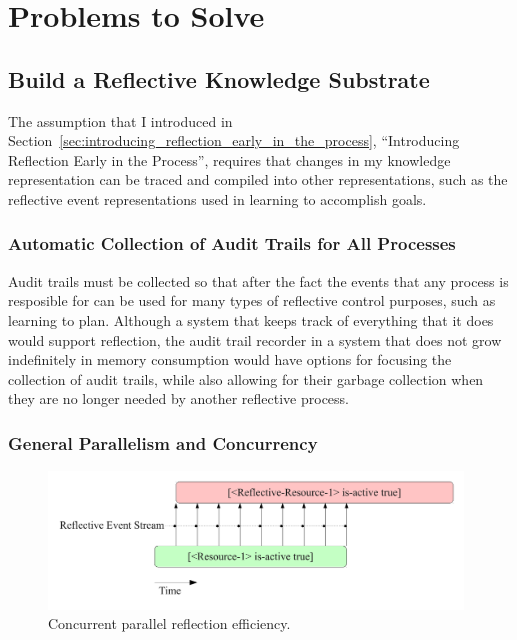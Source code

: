 \chapter{Problems to Solve}\label{ch:problems_to_solve}

\section{Build a Reflective Knowledge Substrate}

The assumption that I introduced in
Section~\ref{sec:introducing_reflection_early_in_the_process},
``Introducing Reflection Early in the Process'', requires that changes
in my knowledge representation can be traced and compiled into other
representations, such as the reflective event representations used in
learning to accomplish goals.

\subsection{Automatic Collection of Audit Trails for All Processes}

Audit trails must be collected so that after the fact the events that
any process is resposible for can be used for many types of reflective
control purposes, such as learning to plan.  Although a system that
keeps track of everything that it does would support reflection, the
audit trail recorder in a system that does not grow indefinitely in
memory consumption would have options for focusing the collection of
audit trails, while also allowing for their garbage collection when
they are no longer needed by another reflective process.

\subsection{General Parallelism and Concurrency}

\begin{figure}[bth]
  \center
  \includegraphics[width=11cm]{gfx/concurrent_parallel_reflection_efficiency}
  \caption[Concurrent parallel reflection efficiency]{Concurrent parallel reflection efficiency.}
  \label{fig:concurrent_parallel_reflection_efficiency}
\end{figure}

